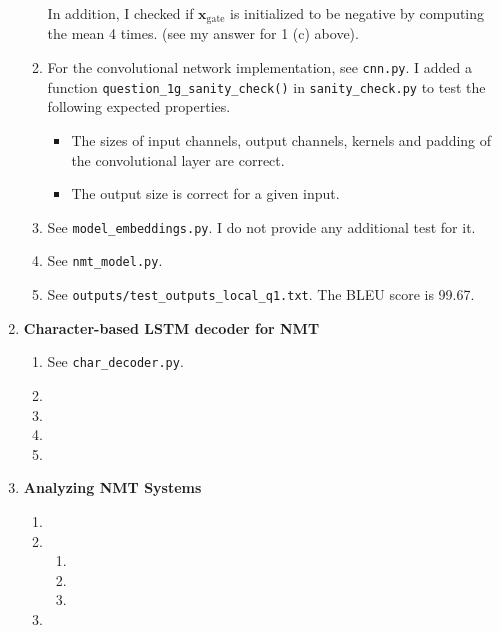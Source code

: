 \documentclass[12pt]{article}
\begin{document}
\begin{enumerate}[label=\textbf{\arabic*.}]
\begin{enumerate}[label=(\alph*)]
    In addition, I checked if $\bm{x}_\text{gate}$ is initialized to be negative by computing the mean 4 times. (see my answer for 1 (c) above).
    \item For the convolutional network implementation, see \texttt{cnn.py}. I added a function \texttt{question\_1g\_sanity\_check()} in \texttt{sanity\_check.py} to test the following expected properties.
    \begin{itemize}
      \item The sizes of input channels, output channels, kernels and padding of the convolutional layer are correct.
      \item The output size is correct for a given input.
    \end{itemize}
    \item See \texttt{model\_embeddings.py}. I do not provide any additional test for it.
    \item See \texttt{nmt\_model.py}.
    \item See \texttt{outputs/test\_outputs\_local\_q1.txt}. The BLEU score is 99.67.
  \end{enumerate}
  \item \textbf{Character-based LSTM decoder for NMT}
  \begin{enumerate}[label=(\alph*)]
    \item See \texttt{char\_decoder.py}.
    \item
    \item
    \item
    \item
  \end{enumerate}
  \item \textbf{Analyzing NMT Systems}
  \begin{enumerate}[label=(\alph*)]
    \item
    \item
    \begin{enumerate}[label=\roman*.]
      \item
      \item
      \item
    \end{enumerate}
    \item
  \end{enumerate}
\end{enumerate}
\end{document}
